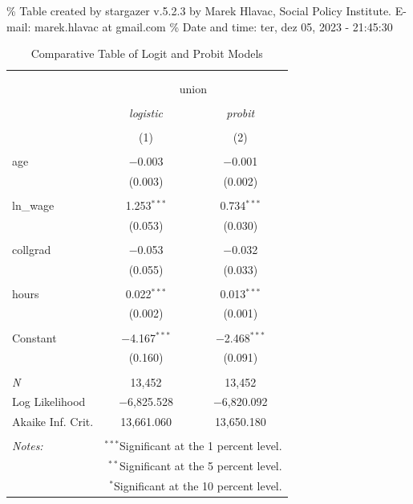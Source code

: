 \documentclass[
]{article}
\begin{document}
\% Table created by stargazer v.5.2.3 by Marek Hlavac, Social Policy
Institute. E-mail: marek.hlavac at gmail.com \% Date and time: ter, dez
05, 2023 - 21:45:30

\begin{table}[!htbp] \centering 
  \caption{Comparative Table of Logit and Probit Models} 
  \label{} 
\begin{tabular}{@{\extracolsep{5pt}}lcc} 
\\[-1.8ex]\hline 
\hline \\[-1.8ex] 
\\[-1.8ex] & \multicolumn{2}{c}{union} \\ 
\\[-1.8ex] & \textit{logistic} & \textit{probit} \\ 
\\[-1.8ex] & (1) & (2)\\ 
\hline \\[-1.8ex] 
 age & $-$0.003 & $-$0.001 \\ 
  & (0.003) & (0.002) \\ 
  & & \\ 
 ln\_wage & 1.253$^{***}$ & 0.734$^{***}$ \\ 
  & (0.053) & (0.030) \\ 
  & & \\ 
 collgrad & $-$0.053 & $-$0.032 \\ 
  & (0.055) & (0.033) \\ 
  & & \\ 
 hours & 0.022$^{***}$ & 0.013$^{***}$ \\ 
  & (0.002) & (0.001) \\ 
  & & \\ 
 Constant & $-$4.167$^{***}$ & $-$2.468$^{***}$ \\ 
  & (0.160) & (0.091) \\ 
  & & \\ 
\textit{N} & 13,452 & 13,452 \\ 
Log Likelihood & $-$6,825.528 & $-$6,820.092 \\ 
Akaike Inf. Crit. & 13,661.060 & 13,650.180 \\ 
\hline 
\hline \\[-1.8ex] 
\textit{Notes:} & \multicolumn{2}{r}{$^{***}$Significant at the 1 percent level.} \\ 
 & \multicolumn{2}{r}{$^{**}$Significant at the 5 percent level.} \\ 
 & \multicolumn{2}{r}{$^{*}$Significant at the 10 percent level.} \\ 
\end{tabular} 
\end{table}
\end{document}
